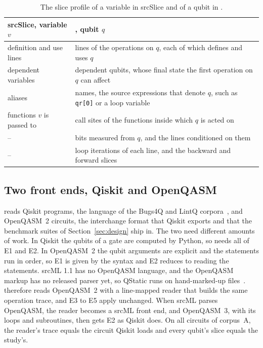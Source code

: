 \begin{table}[t]
  \centering
  \caption{The slice profile of a variable in srcSlice and of a qubit in \tool{}.}
  \label{tab:profile}
  \footnotesize\setlength{\tabcolsep}{3pt}
  \begin{tabular}{@{}p{} p{}@{}}
    \toprule
    srcSlice, variable $v$ & \tool{}, qubit $q$ \\
    \midrule
    definition and use lines & lines of the operations on $q$, each of which defines and uses $q$ \\
    dependent variables & dependent qubits, whose final state the first operation on $q$ can affect \\
    aliases & names, the source expressions that denote $q$, such as \texttt{qr[0]} or a loop variable \\
    functions $v$ is passed to & call sites of the functions inside which $q$ is acted on \\
    -- & bits measured from $q$, and the lines conditioned on them \\
    -- & loop iterations of each line, and the backward and forward slices \\
    \bottomrule
  \end{tabular}
\end{table}

\subsection{Two front ends, Qiskit and OpenQASM}
\tool{} reads Qiskit programs, the language of the Bugs4Q and LintQ corpora~\cite{zhao2023bugs4q,
paltenghi2024lintq}, and OpenQASM~2 circuits, the interchange format that Qiskit
exports and that the benchmark suites of Section~\ref{sec:design} ship in. The two need different amounts of
work. In Qiskit the qubits of a gate are computed by Python, so \tool{} needs all of E1 and E2. In
OpenQASM~2 the qubit arguments are explicit and the statements run in order, so E1 is given by the syntax and E2
reduces to reading the statements. srcML 1.1 has no OpenQASM language, and the OpenQASM markup has no released parser yet, so
QStatic runs on hand-marked-up files~\cite{behler2025static}. \tool{} therefore reads OpenQASM~2 with a line-mapped reader that builds the same operation
trace, and E3 to E5 apply unchanged. When srcML parses OpenQASM, the reader becomes a srcML front end, and
OpenQASM~3, with its loops and subroutines, then gets E2 as Qiskit does. On all \numQasmCircuitsChecked{}
circuits of corpus~A, the reader's trace equals the circuit Qiskit loads and every qubit's slice equals the
study's.


